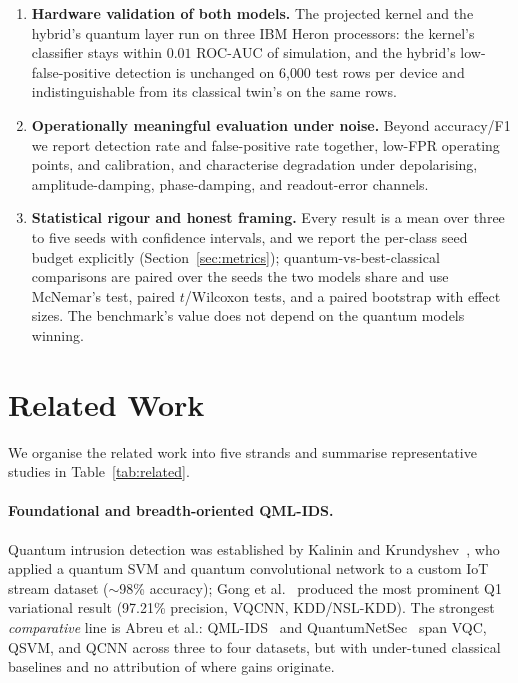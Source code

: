 \documentclass[preprint,11pt]{elsarticle}
\begin{document}
\begin{enumerate}
Holding attack families out of training on UNSW-NB15, ToN-IoT and CICIDS2017 (26 runs) recreates the
selection failure, including a spurious $0.17$ quantum lead on CICIDS2017, while at its best setting the
quantum kernel never leads by more than $0.003$. The squared MMD between training and unlabelled test
traffic tracks how badly cross-validation fails. Leave-attack-types-out cross-validation repairs
selection on NSL-KDD but not under induced shift, so we recommend reporting kernel comparisons under
several selection rules with the oracle bound. The geometric difference of Huang et al., on all four
datasets, shows the IQP kernel to be reproducible by a classical kernel on its own circuit phases.
\item \textbf{Hardware validation of both models.} The projected kernel and the hybrid's quantum layer
run on three IBM Heron processors: the kernel's classifier stays within $0.01$ ROC-AUC of simulation,
and the hybrid's low-false-positive detection is unchanged on 6{,}000 test rows per device and
indistinguishable from its classical twin's on the same rows.

\item \textbf{Operationally meaningful evaluation under noise.} Beyond accuracy/F1 we report
detection rate and false-positive rate together, low-FPR operating points, and calibration, and
characterise degradation under depolarising, amplitude-damping, phase-damping, and readout-error
channels.
\item \textbf{Statistical rigour and honest framing.} Every result is a mean over three to five
seeds with confidence intervals, and we report the per-class seed budget explicitly
(Section~\ref{sec:metrics}); quantum-vs-best-classical comparisons are paired over the seeds the two
models share and use McNemar's test, paired $t$/Wilcoxon tests, and a paired bootstrap with effect
sizes. The benchmark's value does not depend on the quantum models winning.
\end{enumerate}

\section{Related Work}
We organise the related work into five strands and summarise representative studies in
Table~\ref{tab:related}.

\paragraph{Foundational and breadth-oriented QML-IDS.}
Quantum intrusion detection was established by Kalinin and Krundyshev~\cite{kalinin2022}, who
applied a quantum SVM and quantum convolutional network to a custom IoT stream dataset
($\sim$98\% accuracy); Gong et al.~\cite{gong2024vqcnn} produced the most prominent Q1
variational result (97.21\% precision, VQCNN, KDD/NSL-KDD). The strongest \emph{comparative}
line is Abreu et al.: QML-IDS~\cite{abreu2024qmlids} and QuantumNetSec~\cite{abreu2025quantumnetsec}
span VQC, QSVM, and QCNN across three to four datasets, but with under-tuned classical baselines
and no attribution of where gains originate.
\end{document}

